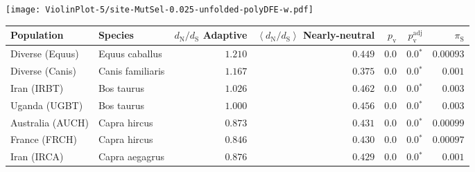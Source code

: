 \begin{center}
\begin{adjustbox}{width = 1\textwidth}
\begin{tabular}{|l|l|r|r|r|r|r|r|r|}
\bottomrule
\end{tabular}
\end{adjustbox}
\newpage
\texttt{[image: ViolinPlot-5/site-MutSel-0.025-unfolded-polyDFE-w.pdf]} 
\begin{adjustbox}{width = 1\textwidth}
\begin{tabular}{|l|l|r|r|r|r|r|}
\toprule
                     Population &              Species & \specialcell{$d_{\mathrm{N}} / d_{\mathrm{S}}$ \\ Adaptive} & \specialcell{$\left< d_{\mathrm{N}} / d_{\mathrm{S}} \right>$ \\ Nearly-neutral} & $p_{\mathrm{v}}$ & $p_{\mathrm{v}}^{\mathrm{adj}}$ & $\pi_{\textrm{S}}$ \\
\midrule
                Diverse (Equus) &       Equus caballus &                                           $ 1.210$ &                                           $ 0.449$ &            $0.0$ &                  $\bm{0.0{^*}}$ &          $0.00093$ \\
                Diverse (Canis) &     Canis familiaris &                                           $ 1.167$ &                                           $ 0.375$ &            $0.0$ &                  $\bm{0.0{^*}}$ &           $ 0.001$ \\
                    Iran (IRBT) &           Bos taurus &                                           $ 1.026$ &                                           $ 0.462$ &            $0.0$ &                  $\bm{0.0{^*}}$ &           $ 0.003$ \\
                  Uganda (UGBT) &           Bos taurus &                                           $ 1.000$ &                                           $ 0.456$ &            $0.0$ &                  $\bm{0.0{^*}}$ &           $ 0.003$ \\
               Australia (AUCH) &         Capra hircus &                                           $ 0.873$ &                                           $ 0.431$ &            $0.0$ &                  $\bm{0.0{^*}}$ &          $0.00099$ \\
                  France (FRCH) &         Capra hircus &                                           $ 0.846$ &                                           $ 0.430$ &            $0.0$ &                  $\bm{0.0{^*}}$ &          $0.00097$ \\
                    Iran (IRCA) &       Capra aegagrus &                                           $ 0.876$ &                                           $ 0.429$ &            $0.0$ &                  $\bm{0.0{^*}}$ &           $ 0.001$ \\

\end{tabular}
\end{adjustbox}
\end{center}
